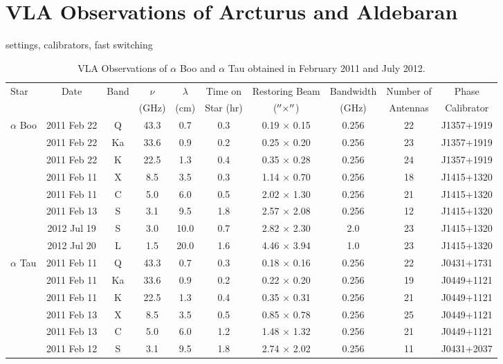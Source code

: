\section{VLA Observations of Arcturus and Aldebaran}\label{sec:3.6}

settings, calibrators, fast switching

\begin{landscape}
\begin{table}
\begin{center}
\caption[VLA Observations of $\alpha$ Boo and $\alpha$ Tau.]
{VLA Observations of $\alpha$ Boo and $\alpha$ Tau obtained in February 2011 and July 2012.}
\begin{tabular}{lccccccccc}
\hline
\hline
\rule{0pt}{2.5ex}Star & Date & Band & $\nu$	& $\lambda$& Time on& Restoring Beam			& Bandwidth & Number of&Phase\\
	 & 		&  & (GHz)		& (cm)		& Star (hr)		  & ($^{\prime\prime} \times ^{\prime\prime}$)& (GHz)		& Antennas&Calibrator\\
\hline
\rule{0pt}{2.5ex} $\alpha$ Boo 	& 2011 Feb 22 & Q	& 43.3 & 0.7		& 0.3 	&0.19 $\times$ 0.15& 0.256	&22& J1357+1919  \\
				& 2011 Feb 22 & Ka	& 33.6 & 0.9		& 0.2 	&0.25 $\times$ 0.20& 0.256 	&23&J1357+1919  \\
				& 2011 Feb 22 & K	& 22.5 & 1.3		& 0.4	&0.35 $\times$ 0.28& 0.256 	&24&J1357+1919  \\
				& 2011 Feb 11 & X	& 8.5  & 3.5		& 0.3 	&1.14 $\times$ 0.70& 0.256 	&18&J1415+1320  \\
				& 2011 Feb 11 & C	& 5.0  & 6.0 		& 0.5	&2.02 $\times$ 1.30& 0.256 	&21& J1415+1320 \\
				& 2011 Feb 13 & S	& 3.1  & 9.5 		& 1.8 	&2.57 $\times$ 2.08& 0.256 	&12& J1415+1320 \\
				& 2012 Jul 19 & S	& 3.0  & 10.0 		& 0.7 	&2.82 $\times$ 2.30& 2.0		&23& J1415+1320 \\
				& 2012 Jul 20 & L	& 1.5  & 20.0		& 1.6 	&4.46 $\times$ 3.94& 1.0		&23& J1415+1320 \\
\hline
\rule{0pt}{2.5ex}  $\alpha$ Tau	& 2011 Feb 11 & Q	& 43.3 & 0.7 		& 0.3 	&0.18 $\times$ 0.16& 0.256 	&22&  J0431+1731\\
				& 2011 Feb 11 & Ka	& 33.6 & 0.9 		& 0.2 	&0.22 $\times$ 0.20& 0.256 	&19&  J0449+1121\\
				& 2011 Feb 11 & K	& 22.5 & 1.3 		& 0.4 	&0.35 $\times$ 0.31& 0.256 	&21&  J0449+1121\\
				& 2011 Feb 13 & X	&  8.5 & 3.5 		& 0.5	&0.85 $\times$ 0.78& 0.256 	&25&  J0449+1121\\
				& 2011 Feb 13 & C	&  5.0 & 6.0 		& 1.2	&1.48 $\times$ 1.32& 0.256 	&21&  J0449+1121\\
				& 2011 Feb 12 & S	&  3.1 & 9.5 		& 1.8 	&2.74 $\times$ 2.02& 0.256 	&11&  J0431+2037\\ 
\hline
\end{tabular}
\label{tab:1}
\end{center}
\end{table}
\end{landscape}

